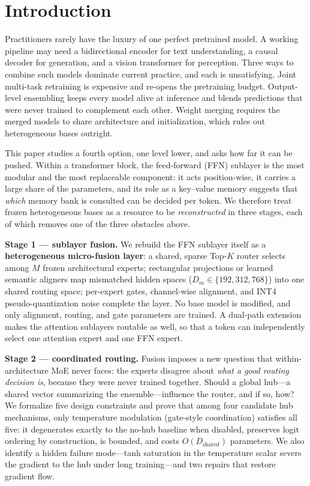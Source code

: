 \documentclass[10pt]{article}
\theoremstyle{definition}
\theoremstyle{plain}
\theoremstyle{remark}
\begin{document}
\section{Introduction}
\label{sec:intro}

Practitioners rarely have the luxury of one perfect pretrained model. A working pipeline may need a bidirectional encoder for text understanding, a causal decoder for generation, and a vision transformer for perception. Three ways to combine such models dominate current practice, and each is unsatisfying. Joint multi-task retraining is expensive and re-opens the pretraining budget. Output-level ensembling keeps every model alive at inference and blends predictions that were never trained to complement each other. Weight merging \citep{ilharco2023,yadav2023,wortsman2022} requires the merged models to share architecture and initialization, which rules out heterogeneous bases outright.

This paper studies a fourth option, one level lower, and asks how far it can be pushed. Within a transformer block, the feed-forward (FFN) sublayer is the most modular and the most replaceable component: it acts position-wise, it carries a large share of the parameters, and its role as a key--value memory \citep{geva2021} suggests that \emph{which} memory bank is consulted can be decided per token. We therefore treat frozen heterogeneous bases as a resource to be \emph{reconstructed} in three stages, each of which removes one of the three obstacles above.

\textbf{Stage 1 --- sublayer fusion.} We rebuild the FFN sublayer itself as a \textbf{heterogeneous micro-fusion layer}: a shared, sparse Top-$K$ router selects among $M$ frozen architectural experts; rectangular projections or learned semantic aligners map mismatched hidden spaces ($D_m \in \{192, 312, 768\}$) into one shared routing space; per-expert gates, channel-wise alignment, and INT4 pseudo-quantization noise complete the layer. No base model is modified, and only alignment, routing, and gate parameters are trained. A dual-path extension makes the attention sublayers routable as well, so that a token can independently select one attention expert and one FFN expert.

\textbf{Stage 2 --- coordinated routing.} Fusion imposes a new question that within-architecture MoE never faces: the experts disagree about \emph{what a good routing decision is}, because they were never trained together. Should a global hub---a shared vector summarizing the ensemble---influence the router, and if so, how? We formalize five design constraints and prove that among four candidate hub mechanisms, only temperature modulation (gate-style coordination) satisfies all five: it degenerates exactly to the no-hub baseline when disabled, preserves logit ordering by construction, is bounded, and costs $O(D_{\text{shared}})$ parameters. We also identify a hidden failure mode---tanh saturation in the temperature scalar severs the gradient to the hub under long training---and two repairs that restore gradient flow.
\end{document}

